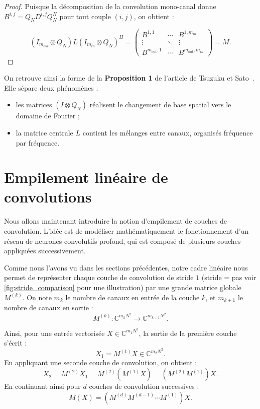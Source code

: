 \begin{proof}
Puisque la décomposition de la convolution mono-canal donne $B^{i,j} = Q_N D^{i,j} Q_N^H$ pour 
tout couple $(i,j)$, on obtient :

$$
(I_{m_{out}} \otimes Q_N) L (I_{m_{in}} \otimes Q_N)^H = 
\begin{pmatrix}
B^{1,1} & \cdots & B^{1,m_{in}} \\
\vdots & \ddots & \vdots \\
B^{m_{out},1} & \cdots & B^{m_{out},m_{in}}
\end{pmatrix}
= M.
$$
\end{proof}

On retrouve ainsi la forme de la \textbf{Proposition 1} de l'article de Tsuzuku et Sato~\cite{tsuzuku2019structural}. 
Elle sépare deux phénomènes :
\begin{itemize}
    \item les matrices $(I\otimes Q_N)$ réalisent le changement de base spatial vers le domaine de Fourier ;
    \item la matrice centrale $L$ contient les mélanges entre canaux, organisés fréquence par fréquence.
\end{itemize}

\section{Empilement linéaire de convolutions}
\label{sec:empilement-lineaire-convolutions}

Nous allons maintenant introduire la notion d'empilement de couches de convolution. 
L'idée est de modéliser mathématiquement le fonctionnement d'un réseau de neurones convolutifs profond, qui est 
composé de plusieurs couches appliquées successivement.

Comme nous l'avons vu dans les sections précédentes, notre cadre linéaire nous permet de représenter chaque couche 
de convolution de stride \(1\) (stride = pas voir \ref{fig:stride_comparison} pour une illustration) par une grande matrice globale \(M^{(k)}\). 
On note \(m_k\) le nombre de canaux en entrée de la couche \(k\), et \(m_{k+1}\) le nombre de canaux en sortie :
\[
M^{(k)} : \mathbb{C}^{m_k N^2} \longrightarrow \mathbb{C}^{m_{k+1}N^2}.
\]

Ainsi, pour une entrée vectorisée \(X \in \mathbb{C}^{m_1N^2}\), la sortie de la 
première couche s'écrit :
$$
X_1 = M^{(1)} X \in \mathbb{C}^{m_2 N^2}.
$$
En appliquant une seconde couche de convolution, on obtient :
$$
X_2 = M^{(2)} X_1 = M^{(2)}(M^{(1)} X) = (M^{(2)} M^{(1)}) X.
$$
En continuant ainsi pour $d$ couches de convolution successives :
\begin{equation}
M(X) = \left(M^{(d)} M^{(d-1)} \cdots M^{(1)}\right)X.
\label{eq:composition_couches}
\end{equation}


